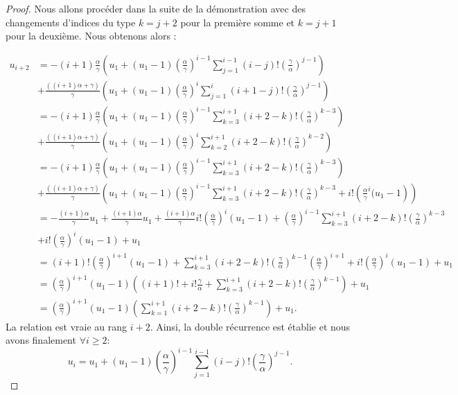 \documentclass[12pt,a4paper]{report}
\theoremstyle{remark}
\begin{document}
\begin{proof}
Nous allons procéder dans la suite de la démonstration avec des changements d'indices du type $k=j+2$ pour la première somme et $k=j+1$ pour la deuxième. Nous obtenons alors :

\begin{align*}
u_{i+2} &= -(i+1) \frac{\alpha}{\gamma} \left(u_1 + (u_1 - 1)\left(\frac{\alpha}{\gamma}\right)^{i-1} \sum_{j=1}^{i-1}(i-j)!\left(\frac{\gamma}{\alpha}\right)^{j-1}\right) \\
&+ \frac{((i+1) \alpha + \gamma)}{\gamma} \left(u_1 + (u_1 - 1)\left(\frac{\alpha}{\gamma}\right)^{i} \sum_{j=1}^{i}(i+1-j)!\left(\frac{\gamma}{\alpha}\right)^{j-1}\right) \\
&= -(i+1) \frac{\alpha}{\gamma} \left(u_1 + (u_1 - 1)\left(\frac{\alpha}{\gamma}\right)^{i-1} \sum_{k=3}^{i+1}(i+2-k)!\left(\frac{\gamma}{\alpha}\right)^{k-3}\right) \\
&+ \frac{((i+1) \alpha + \gamma)}{\gamma} \left(u_1 + (u_1 - 1)\left(\frac{\alpha}{\gamma}\right)^{i} \sum_{k=2}^{i+1}(i+2-k)!\left(\frac{\gamma}{\alpha}\right)^{k-2}\right) \\
&= -(i+1) \frac{\alpha}{\gamma} \left(u_1 + (u_1 - 1)\left(\frac{\alpha}{\gamma}\right)^{i-1} \sum_{k=3}^{i+1}(i+2-k)!\left(\frac{\gamma}{\alpha}\right)^{k-3}\right) \\
&+ \frac{((i+1) \alpha + \gamma)}{\gamma} \left(u_1 + (u_1 - 1)\left(\frac{\alpha}{\gamma}\right)^{i-1} \sum_{k=3}^{i+1}(i+2-k)!\left(\frac{\gamma}{\alpha}\right)^{k-3} + i! \left(\frac{\alpha}{\gamma}^i(u_1 - 1\right)\right) \\
&= -\frac{(i+1)\alpha}{\gamma} u_1 + \frac{(i+1)\alpha}{\gamma} u_1 + \frac{(i+1)\alpha}{\gamma} i! \left(\frac{\alpha}{\gamma}\right)^i (u_1 - 1) + \left(\frac{\alpha}{\gamma}\right)^{i-1} \sum_{k=3}^{i+1}(i+2-k)!\left(\frac{\gamma}{\alpha}\right)^{k-3} \\
&+ i! \left(\frac{\alpha}{\gamma}\right)^i (u_1 - 1) + u_1 \\
&= (i+1)! \left(\frac{\alpha}{\gamma}\right)^{i+1} (u_1 - 1) + \sum_{k=3}^{i+1}(i+2-k)!\left(\frac{\gamma}{\alpha}\right)^{k-1} \left(\frac{\alpha}{\gamma}\right)^{i+1} + i! \left(\frac{\alpha}{\gamma}\right)^i (u_1 - 1) + u_1 \\
&= \left(\frac{\alpha}{\gamma}\right)^{i+1} (u_1 - 1) \left((i+1)! + i! \frac{\gamma}{\alpha} + \sum_{k=3}^{i+1}(i+2-k)!\left(\frac{\gamma}{\alpha}\right)^{k-1} \right) + u_1 \\
&= \left(\frac{\alpha}{\gamma}\right)^{i+1} (u_1 - 1) \left(\sum_{k=1}^{i+1}(i+2-k)!\left(\frac{\gamma}{\alpha}\right)^{k-1} \right) + u_1.
\end{align*}
La relation est vraie au rang $i+2$. Ainsi, la double récurrence est établie et nous avons finalement $\forall i \geqslant 2$:
$$u_i = u_1 + (u_1 - 1)\left(\frac{\alpha}{\gamma}\right)^{i-1} \sum_{j=1}^{i-1}(i-j)!\left(\frac{\gamma}{\alpha}\right)^{j-1}.$$


\end{proof}
\end{document}
